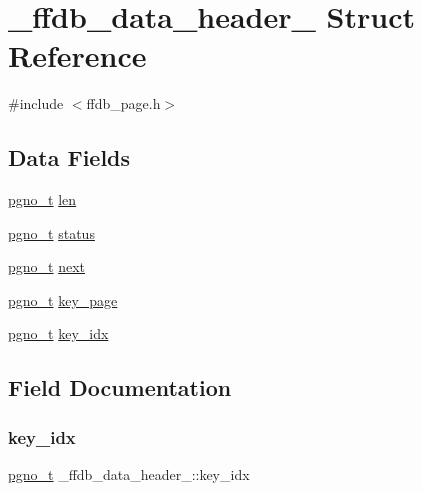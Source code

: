 \hypertarget{struct__ffdb__data__header__}{}\section{\+\_\+ffdb\+\_\+data\+\_\+header\+\_\+ Struct Reference}
\label{struct__ffdb__data__header__}


{\ttfamily \#include $<$ffdb\+\_\+page.\+h$>$}

\subsection*{Data Fields}
\begin{DoxyCompactItemize}
\item 
\mbox{\hyperlink{other__libs_2filedb_2filehash_2ffdb__db_8h_a000813331643d38481142bcce7de1501}{pgno\+\_\+t}} \mbox{\hyperlink{struct__ffdb__data__header___ae92f78b964c32a66a889e0f8926f39e9}{len}}
\item 
\mbox{\hyperlink{other__libs_2filedb_2filehash_2ffdb__db_8h_a000813331643d38481142bcce7de1501}{pgno\+\_\+t}} \mbox{\hyperlink{struct__ffdb__data__header___a4c2b44b141df921e83933b19b1fd4e44}{status}}
\item 
\mbox{\hyperlink{other__libs_2filedb_2filehash_2ffdb__db_8h_a000813331643d38481142bcce7de1501}{pgno\+\_\+t}} \mbox{\hyperlink{struct__ffdb__data__header___a6eec9d909ab0bdaa5d2290d815f9f90e}{next}}
\item 
\mbox{\hyperlink{other__libs_2filedb_2filehash_2ffdb__db_8h_a000813331643d38481142bcce7de1501}{pgno\+\_\+t}} \mbox{\hyperlink{struct__ffdb__data__header___a91aed66c809924649b60df3bc202f082}{key\+\_\+page}}
\item 
\mbox{\hyperlink{other__libs_2filedb_2filehash_2ffdb__db_8h_a000813331643d38481142bcce7de1501}{pgno\+\_\+t}} \mbox{\hyperlink{struct__ffdb__data__header___a758886b1c2b9be81b4b08f3265571036}{key\+\_\+idx}}
\end{DoxyCompactItemize}


\subsection{Field Documentation}
\mbox{\label{struct__ffdb__data__header___a758886b1c2b9be81b4b08f3265571036}} 
\subsubsection{\texorpdfstring{key\_idx}{key\_idx}}
{\footnotesize\ttfamily \mbox{\hyperlink{other__libs_2filedb_2filehash_2ffdb__db_8h_a000813331643d38481142bcce7de1501}{pgno\+\_\+t}} \+\_\+ffdb\+\_\+data\+\_\+header\+\_\+\+::key\+\_\+idx}

